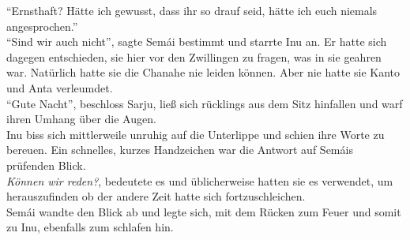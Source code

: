 ``Ernsthaft? Hätte ich gewusst, dass ihr so drauf seid, hätte ich euch niemals angesprochen.''\\
``Sind wir auch nicht'', sagte Semái bestimmt und starrte Inu an. Er hatte sich dagegen 
entschieden, sie hier vor den Zwillingen zu fragen, was in sie geahren war. Natürlich hatte sie 
die Chanahe nie leiden können. Aber nie hatte sie Kanto und Anta verleumdet.\\
``Gute Nacht'', beschloss Sarju, ließ sich rücklings aus dem Sitz hinfallen und warf ihren Umhang 
über die Augen.\\
Inu biss sich mittlerweile unruhig auf die Unterlippe und schien ihre Worte zu bereuen. Ein 
schnelles, kurzes Handzeichen war die Antwort auf Semáis prüfenden Blick.\\
\textit{Können wir reden?}, bedeutete es und üblicherweise hatten sie es verwendet, um 
herauszufinden ob der andere Zeit hatte sich fortzuschleichen.\\
Semái wandte den Blick ab und legte sich, mit dem Rücken zum Feuer und somit zu Inu, ebenfalls zum 
schlafen hin. 


